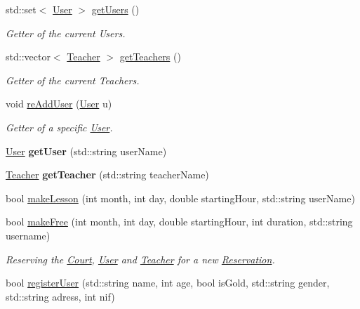 \begin{DoxyCompactItemize}
std\+::set$<$ \mbox{\hyperlink{class_user}{User}} $>$ \mbox{\hyperlink{class_company_a06704156dc1962518149b2307e448691}{get\+Users}} ()
\begin{DoxyCompactList}\small\item\em Getter of the current Users. \end{DoxyCompactList}\item 
std\+::vector$<$ \mbox{\hyperlink{class_teacher}{Teacher}} $>$ \mbox{\hyperlink{class_company_a000159ce012318a6edf0335447ad8bde}{get\+Teachers}} ()
\begin{DoxyCompactList}\small\item\em Getter of the current Teachers. \end{DoxyCompactList}\item 
void \mbox{\hyperlink{class_company_acbd7b1d6be4ae5e3322add41e2be256e}{re\+Add\+User}} (\mbox{\hyperlink{class_user}{User}} u)
\begin{DoxyCompactList}\small\item\em Getter of a specific \mbox{\hyperlink{class_user}{User}}. \end{DoxyCompactList}\item 
\mbox{\label{class_company_a1f222b5e97b060c0603c42e64d7567a6}} 
\mbox{\hyperlink{class_user}{User}} {\bfseries get\+User} (std\+::string user\+Name)
\item 
\mbox{\label{class_company_a166411c9ee427d89abd9349191434fbf}} 
\mbox{\hyperlink{class_teacher}{Teacher}} {\bfseries get\+Teacher} (std\+::string teacher\+Name)
\item 
bool \mbox{\hyperlink{class_company_a88745d2eaf511e686eccfa14601a302b}{make\+Lesson}} (int month, int day, double starting\+Hour, std\+::string user\+Name)
\item 
bool \mbox{\hyperlink{class_company_a56fa75dd66690eae0853a3f3278220e3}{make\+Free}} (int month, int day, double starting\+Hour, int duration, std\+::string username)
\begin{DoxyCompactList}\small\item\em Reserving the \mbox{\hyperlink{class_court}{Court}}, \mbox{\hyperlink{class_user}{User}} and \mbox{\hyperlink{class_teacher}{Teacher}} for a new \mbox{\hyperlink{class_reservation}{Reservation}}. \end{DoxyCompactList}\item 
bool \mbox{\hyperlink{class_company_a5ac9ee475217b3b568a447f9d3535c7d}{register\+User}} (std\+::string name, int age, bool is\+Gold, std\+::string gender, std\+::string adress, int nif)

\end{DoxyCompactItemize}

